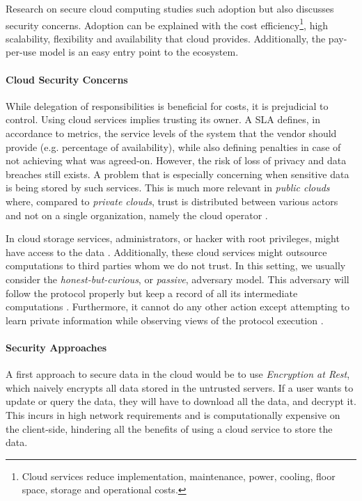 Research on secure cloud computing \autocite{Carroll2011-me} studies such adoption but also discusses security concerns. Adoption can be explained with the cost efficiency\footnote{Cloud services reduce implementation, maintenance, power, cooling, floor space, storage and operational costs.}, high scalability, flexibility and availability that cloud provides. Additionally, the pay-per-use model is an easy entry point to the ecosystem.

\paragraph{Cloud Security Concerns} While delegation of responsibilities is beneficial for costs, it is prejudicial to control. Using cloud services implies trusting its owner. A \gls{SLA} defines, in accordance to metrics, the service levels of the system that the vendor should provide (e.g. percentage of availability), while also defining penalties in case of not achieving what was agreed-on. However, the risk of loss of privacy and data breaches still exists. A problem that is especially concerning when sensitive data is being stored by such services. This is much more relevant in \emph{public clouds} where, compared to \emph{private clouds}, trust is distributed between various actors and not on a single organization, namely the cloud operator \autocite{Carroll2011-me}.

In cloud storage services, administrators, or hacker with root privileges, might have access to the data \autocite{Bosch2014-eb}. Additionally, these cloud services might outsource computations to third parties whom we do not trust. In this setting, we usually consider the \emph{honest-but-curious}, or \emph{passive}, adversary model. This adversary will follow the protocol properly but keep a record of all its intermediate computations \autocite{Goldreich2001-sr}. Furthermore, it cannot do any other action except attempting to learn private information while observing views of the protocol execution \autocite{Evans2018-it}.

\paragraph{Security Approaches} A first approach to secure data in the cloud would be to use \emph{Encryption at Rest}, which naively encrypts all data stored in the untrusted servers. If a user wants to update or query the data, they will have to download all the data, and decrypt it. This incurs in high network requirements and is computationally expensive on the client-side, hindering all the benefits of using a cloud service to store the data. 

